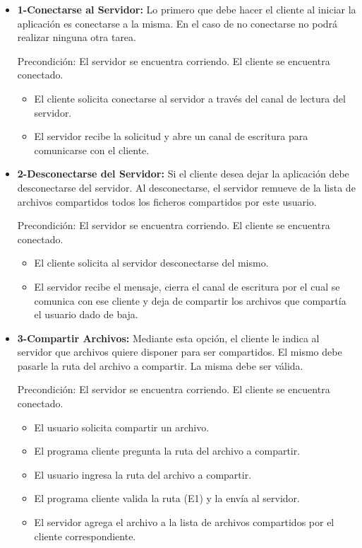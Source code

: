\documentclass[a4paper,10pt]{article}
\begin{document}
			\begin{itemize}
				
                \item \textbf{1-Conectarse al Servidor:} Lo primero que debe hacer el cliente al iniciar la aplicaci\'on es conectarse a la misma. En el caso
				de no conectarse no podr\'a realizar ninguna otra tarea.
                
                Precondici\'on: El servidor se encuentra corriendo. El cliente se encuentra conectado.
                \begin{itemize}
                    \item El cliente solicita conectarse al servidor a trav\'es del canal de lectura del servidor.
                    \item El servidor recibe la solicitud y abre un canal de escritura para comunicarse con el cliente.
                \end{itemize}
                
                \item \textbf{2-Desconectarse del Servidor:} Si el cliente desea dejar la aplicaci\'on debe desconectarse del servidor. Al desconectarse, el
				servidor remueve de la lista de archivos compartidos todos los ficheros compartidos por este usuario.
                
                Precondici\'on: El servidor se encuentra corriendo. El cliente se encuentra conectado.
				\begin{itemize}
                    \item El cliente solicita al servidor desconectarse del mismo.
                    \item El servidor recibe el mensaje, cierra el canal de escritura por el cual se comunica con ese cliente y deja de compartir los archivos que compart\'ia el usuario dado de baja.
                \end{itemize}
                
                \item \textbf{3-Compartir Archivos:} Mediante esta opci\'on, el cliente le indica al servidor que archivos quiere disponer para ser compartidos.
				El mismo debe pasarle la ruta del archivo a compartir. La misma debe ser v\'alida.

                Precondici\'on: El servidor se encuentra corriendo. El cliente se encuentra conectado.
                \begin{itemize}
                    \item El usuario solicita compartir un archivo.
                    \item El programa cliente pregunta la ruta del archivo a compartir.
                    \item El usuario ingresa la ruta del archivo a compartir.
                    \item El programa cliente valida la ruta (E1) y la env\'ia al servidor.
                    \item El servidor agrega el archivo a la lista de archivos compartidos por el cliente correspondiente.
                \end{itemize}
                

\end{itemize}
\end{document}
